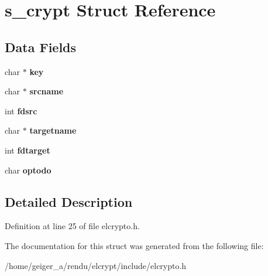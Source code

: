 \hypertarget{structs__crypt}{\section{s\-\_\-crypt Struct Reference}
\label{structs__crypt}
}
\subsection*{Data Fields}
\begin{DoxyCompactItemize}
\item 
\hypertarget{structs__crypt_ab8c5c04202c64bfea36ff9f7877f2804}{char $\ast$ {\bfseries key}}\label{structs__crypt_ab8c5c04202c64bfea36ff9f7877f2804}

\item 
\hypertarget{structs__crypt_a8c5b503cd66745c9e8aba14509fbefe6}{char $\ast$ {\bfseries srcname}}\label{structs__crypt_a8c5b503cd66745c9e8aba14509fbefe6}

\item 
\hypertarget{structs__crypt_abdfde18d0be18702c0f56d121e82dc68}{int {\bfseries fdsrc}}\label{structs__crypt_abdfde18d0be18702c0f56d121e82dc68}

\item 
\hypertarget{structs__crypt_aab6162cb1ed39027f386dcf60e9d9a31}{char $\ast$ {\bfseries targetname}}\label{structs__crypt_aab6162cb1ed39027f386dcf60e9d9a31}

\item 
\hypertarget{structs__crypt_a9bec143a93962010edf642b2d6ddab8e}{int {\bfseries fdtarget}}\label{structs__crypt_a9bec143a93962010edf642b2d6ddab8e}

\item 
\hypertarget{structs__crypt_aa24656eefd317245d0911e577c4ef89a}{char {\bfseries optodo}}\label{structs__crypt_aa24656eefd317245d0911e577c4ef89a}

\end{DoxyCompactItemize}


\subsection{Detailed Description}


Definition at line 25 of file elcrypto.\-h.



The documentation for this struct was generated from the following file\-:\begin{DoxyCompactItemize}
\item 
/home/geiger\-\_\-a/rendu/elcrypt/include/elcrypto.\-h\end{DoxyCompactItemize}
